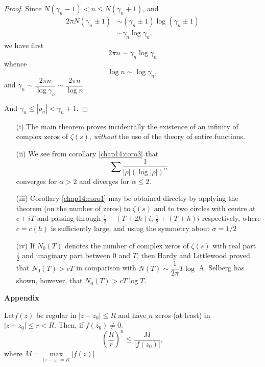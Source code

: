 \begin{proof}
Since $N(\gamma_n -1) < n \leq N (\gamma_n +1)$, and
\begin{align*}
2 \pi N (\gamma_n \pm 1) & \sim (\gamma_n \pm 1) \log (\gamma_n \pm
1)\\
& \sim \gamma_n \log \gamma_n,
\end{align*}\pageoriginale
we have first
$$
2 \pi n \sim \gamma_n\log \gamma_n
$$
whence
$$
\log n \sim \log \gamma_n,
$$
and \quad $\gamma_n \sim \dfrac{2\pi n}{\log \gamma_n} \sim
\dfrac{2\pi n}{\log n}$

\medskip

And \quad $\gamma_n \leq |\rho_n| < \gamma_n + 1$.
\end{proof}

\begin{remarks*}
\begin{itemize}
\item[{\rm (i)}]  The main theorem proves incidentally the existence
  of an infinity of complex zeros of $\zeta(s)$, {\em without} the use of
  the theory of entire functions.

\item[{\rm (ii)}] We see from corollary \ref{chap14:coro3} that 
$$
\sum \frac{1}{|\rho|(\log |\rho|)^\alpha}
$$
converges for $\alpha >2$ and diverges for $\alpha \leq 2$.

\item[{\rm (iii)}] Corollary \ref{chap14:coro1} may be obtained directly by applying
  the theorem (on the number of zeros) to $\zeta(s)$ and to two
  circles with centre at $c+iT$ and passing through $\frac{1}{2}+ (T
  + 2h)i$, $\frac{1}{2}+(T+h)i$ respectively, where $c=c(h)$ is
  sufficiently large, and using the symmetry about $\sigma =1/2$

\item[{\rm (iv)}] If $N_0(T)$ denotes the number of complex zeros of
  $\zeta(s)$ with real part $\frac{1}{2}$ and imaginary part between
  $0$ and $T$, then Hardy and Littlewood proved that $N_0(T)>c T$ in
  comparison with $N(T) \sim \dfrac{1}{2\pi} T \log$ A. Selberg has
  shown, however, that $N_0 (T)>c T \log T$.
\end{itemize}
\end{remarks*}


\begin{center}
{\bf Appendix}
\end{center}

\begin{theorem*}
Let\pageoriginale $f(z)$ be regular in $|z-z_0| \leq R$ and have $n$
zeros (at least) in $|z-z_0| \leq r < R$. Then, if $f(z_0) \neq 0$.
$$
\left(\frac{R}{r}\right)^n \leq \frac{M}{|f(z_0)|},
$$
where $M = \max\limits_{|z-z_0|=R} |f(z)|$
\end{theorem*}

